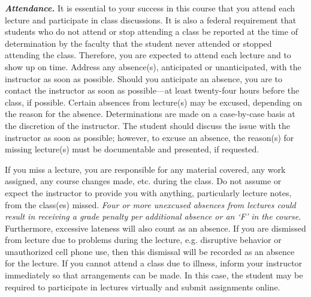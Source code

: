 \documentclass[11pt,letterpaper]{article}
\begin{document}
\newpage






{\itshape\bfseries\color{scred}Attendance.} It is essential to your success in this course that you attend each lecture and participate in class discussions. It is also a federal requirement that students who do not attend or stop attending a class be reported at the time of determination by the faculty that the student never attended or stopped attending the class. Therefore, you are expected to attend each lecture and to show up on time. Address any absence(s), anticipated or unanticipated, with the instructor as soon as possible. Should you anticipate an absence, you are to contact the instructor as soon as possible---at least twenty-four hours before the class, if possible. Certain absences from lecture(s) may be excused, depending on the reason for the absence. Determinations are made on a case-by-case basis at the discretion of the instructor. The student should discuss the issue with the instructor as soon as possible; however, to excuse an absence, the reason(s) for missing lecture(s) must be documentable and presented, if requested. \pspace

If you miss a lecture, you are responsible for any material covered, any work assigned, any course changes made, etc. during the class. Do not assume or expect the instructor to provide you with anything, particularly lecture notes, from the class(es) missed. {\itshape Four or more unexcused absences from lectures could result in receiving a grade penalty per additional absence or an `F' in the course.} Furthermore, excessive lateness will also count as an absence. If you are dismissed from lecture due to problems during the lecture, e.g. disruptive behavior or unauthorized cell phone use, then this dismissal will be recorded as an absence for the lecture. If you cannot attend a class due to illness, inform your instructor immediately so that arrangements can be made. In this case, the student may be required to participate in lectures virtually and submit assignments online. \pspace
\end{document}
